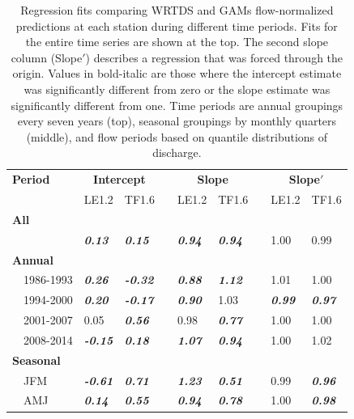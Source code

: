 \documentclass[letterpaper,12pt,oneside]{article}\usepackage[]{graphicx}\usepackage[]{color}
\begin{document}
\begin{table}[!tbp]
\caption{Regression fits comparing \ac{WRTDS} and \acp{GAM} flow-normalized predictions at each station during different time periods.  Fits for the entire time series are shown at the top.  The second slope column (Slope$'$) describes a regression that was forced through the origin.  Values in bold-italic are those where the intercept estimate was significantly different from zero or the slope estimate was significantly different from one.   Time periods are annual groupings every seven years (top), seasonal groupings by monthly quarters (middle), and flow periods based on quantile distributions of discharge.\label{tab:regnorm}} 
\begin{center}
\begin{tabular}{lllcllcll}
\hline\hline
\multicolumn{1}{l}{\bfseries Period}&\multicolumn{2}{c}{\bfseries Intercept}&\multicolumn{1}{c}{\bfseries }&\multicolumn{2}{c}{\bfseries Slope}&\multicolumn{1}{c}{\bfseries }&\multicolumn{2}{c}{\bfseries Slope$'$}\tabularnewline
\cline{2-3} \cline{5-6} \cline{8-9}
\multicolumn{1}{l}{}&\multicolumn{1}{c}{LE1.2}&\multicolumn{1}{c}{TF1.6}&\multicolumn{1}{c}{}&\multicolumn{1}{c}{LE1.2}&\multicolumn{1}{c}{TF1.6}&\multicolumn{1}{c}{}&\multicolumn{1}{c}{LE1.2}&\multicolumn{1}{c}{TF1.6}\tabularnewline
\hline
{\bfseries All}&&&&&&&&\tabularnewline
~~&{\bf \textit{0.13}}&{\bf \textit{0.15}}&&{\bf \textit{0.94}}&{\bf \textit{0.94}}&&1.00&0.99\tabularnewline
\hline
{\bfseries Annual}&&&&&&&&\tabularnewline
~~1986-1993&{\bf \textit{0.26}}&{\bf \textit{-0.32}}&&{\bf \textit{0.88}}&{\bf \textit{1.12}}&&1.01&1.00\tabularnewline
~~1994-2000&{\bf \textit{0.20}}&{\bf \textit{-0.17}}&&{\bf \textit{0.90}}&1.03&&{\bf \textit{0.99}}&{\bf \textit{0.97}}\tabularnewline
~~2001-2007&0.05&{\bf \textit{0.56}}&&0.98&{\bf \textit{0.77}}&&1.00&1.00\tabularnewline
~~2008-2014&{\bf \textit{-0.15}}&{\bf \textit{0.18}}&&{\bf \textit{1.07}}&{\bf \textit{0.94}}&&1.00&1.02\tabularnewline
\hline
{\bfseries Seasonal}&&&&&&&&\tabularnewline
~~JFM&{\bf \textit{-0.61}}&{\bf \textit{0.71}}&&{\bf \textit{1.23}}&{\bf \textit{0.51}}&&0.99&{\bf \textit{0.96}}\tabularnewline
~~AMJ&{\bf \textit{0.14}}&{\bf \textit{0.55}}&&{\bf \textit{0.94}}&{\bf \textit{0.78}}&&1.00&{\bf \textit{0.98}}\tabularnewline

\end{tabular}
\end{center}
\end{table}
\end{document}
